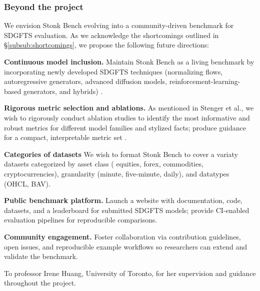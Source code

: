 \documentclass[sigconf]{acmart}
\begin{document}
    \subsubsection{Beyond the project} We envision Stonk Bench
    evolving into a community-driven benchmark for SDGFTS evaluation.
    As we acknowledge the shortcomings outlined in
    §\ref{subsub:shortcomings}, we propose the following future
    directions:
    \begin{enumerate}[label=\textbf{[F\arabic*]}, resume]
      \item \textbf{Continuous model inclusion.}
      Maintain Stonk Bench as a living benchmark by incorporating
      newly developed SDGFTS techniques (normalizing flows,
      autoregressive generators, advanced diffusion models,
      reinforcement-learning-based generators, and hybrids)
      \cite{Potluru24}.
      \item \textbf{Rigorous metric selection and ablations.}
      As mentioned in Stenger et al., we wish to rigorously conduct
      ablation studies to identify the most informative and robust
      metrics for different model families and stylized facts;
      produce guidance for a compact, interpretable metric set
      \cite{Stenger24}.
      \item \textbf{Categories of datasets} We wish to format Stonk
      Bench to cover a variaty datasets categorized by asset class (
      equities, forex, commodities, cryptocurrencies), 
      granularity (minute, five-minute, daily), and datatypes (OHCL,
      BAV).
      \item \textbf{Public benchmark platform.}
      Launch a website with documentation, code, datasets, and a
      leaderboard for submitted SDGFTS models; provide CI-enabled
      evaluation pipelines for reproducible comparisons.
      \item \textbf{Community engagement.}
      Foster collaboration via contribution guidelines, open issues,
      and reproducible example workflows so researchers can extend
      and validate the benchmark.
    \end{enumerate}

\begin{acks}
    To professor Irene Huang, University of Toronto, for her
    supervision and guidance throughout the project.
\end{acks}




\end{document}
